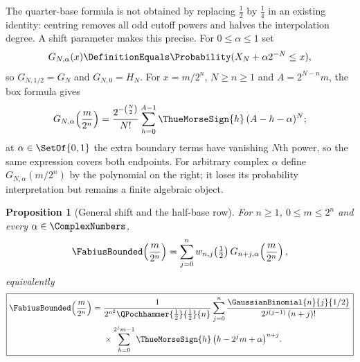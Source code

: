 \documentclass[11pt,oneside]{article}
\theoremstyle{plain}
\newtheorem{proposition}[theorem]{Proposition}
\theoremstyle{definition}
\theoremstyle{remark}
\newcommand{\Fb}{\FabiusBounded}            %
\newcommand{\tm}[1]{\ThueMorseSign{#1}}     %
\newcommand{\Prob}{\Probability}
\newcommand{\qb}[3]{\GaussianBinomial{#1}{#2}{#3}}
\newcommand{\qp}[3]{\QPochhammer{#1}{#2}{#3}}
\begin{document}
The quarter-base formula is not obtained by replacing $\tfrac12$ by
$\tfrac14$ in an existing identity: centring removes all odd cutoff powers
and halves the interpolation degree.  A shift parameter makes this precise.
For $0\le\alpha\le1$ set
\begin{equation}
 G_{N,\alpha}(x)\DefinitionEquals\Prob(X_{N}+\alpha2^{-N}\le x),
 \label{rf:eq:halfbase-shifted}
\end{equation}
so $G_{N,1/2}=G_{N}$ and $G_{N,0}=H_{N}$.  For $x=m/2^{n}$, $N\ge n\ge1$ and
$A=2^{N-n}m$, the box formula gives
\begin{equation}
 G_{N,\alpha}\!\left(\frac{m}{2^{n}}\right)
 =\frac{2^{-\binom{N}{2}}}{N!}\sum_{h=0}^{A-1}\tm{h}\,(A-h-\alpha)^{N};
 \label{rf:eq:halfbase-shifted-finite}
\end{equation}
at $\alpha\in\SetOf{0,1}$ the extra boundary terms have vanishing $N$th
power, so the same expression covers both endpoints.  For arbitrary complex
$\alpha$ define $G_{N,\alpha}(m/2^{n})$ by the polynomial on the right; it
loses its probability interpretation but remains a finite algebraic
object.

\begin{proposition}[General shift and the half-base row]
\label{rf:prop:halfbase}
For $n\ge1$, $0\le m\le2^{n}$ and every $\alpha\in\ComplexNumbers$,
\begin{equation}
 \Fb\!\left(\frac{m}{2^{n}}\right)
 =\sum_{j=0}^{n}w_{n,j}\!\left(\tfrac12\right)G_{n+j,\alpha}\!\left(\frac{m}{2^{n}}\right),
 \label{rf:eq:halfbase-extract}
\end{equation}
equivalently
\begin{equation}
 \boxed{\begin{aligned}
 \Fb\!\left(\frac{m}{2^{n}}\right)={}&\frac{1}{2^{n^{2}}\qp{\frac12}{\frac12}{n}}
 \sum_{j=0}^{n}\frac{\qb{n}{j}{1/2}}{2^{j(j-1)}\,(n+j)!}\\[-0.1em]
 &\times\sum_{h=0}^{2^{j}m-1}\tm{h}\,\bigl(h-2^{j}m+\alpha\bigr)^{n+j}.
 \end{aligned}}
 \label{rf:eq:halfbase-reshetnikov}
\end{equation}
\end{proposition}
\end{document}
